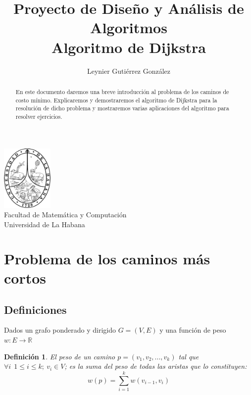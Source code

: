 \documentclass[12pt]{article}
\title{Proyecto de Diseño y Análisis de Algoritmos\\ \vspace{.2cm} \textbf{Algoritmo de Dijkstra}}
\author{Leynier Gutiérrez González}
\newcommand{\nl}{\vspace{0.3cm}}
\newtheorem{definition}{Definición}
\begin{document}
\maketitle

\vspace{0.5cm}

\begin{center}
	\vspace{0.2cm}
	\includegraphics[width=2.5cm]{images/escudo.png}\\
	\vspace{0.2cm}
	Facultad de Matemática y Computación\\
	\vspace{0.1cm}
	Universidad de La Habana\\
	\vspace{1cm}
\end{center}

\vspace{1cm}

\begin{abstract}
	En este documento daremos una breve introducción al problema de los caminos de costo mínimo. Explicaremos y demostraremos el algoritmo de Dijkstra para la resolución de dicho problema y mostraremos varias aplicaciones del algoritmo para resolver ejercicios.
\end{abstract}

\newpage

\tableofcontents

\newpage

\section{Problema de los caminos más cortos}

\subsection{Definiciones}

\nl

Dados un grafo ponderado y dirigido $G = (V, E)$ y una función de peso $w: E \rightarrow \mathbb{R}$

\begin{definition}
	El peso de un camino $p = (v_1, v_2, ... , v_k)$ tal que $\forall i \ \ 1 \leqslant i \leqslant k; \ v_i \in V$; es la suma del peso de todas las aristas que lo constituyen:
	$$w(p) = \sum_{i=1}^{k} w(v_{i-1}, v_i)$$
\end{definition}
\end{document}
